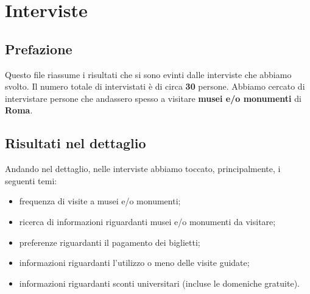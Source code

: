 \def\people{30}

\section{Interviste}
\subsection{Prefazione}
Questo file riassume i risultati che si sono evinti dalle interviste che abbiamo svolto. Il numero totale di intervistati è di circa \textbf{\people} persone. Abbiamo cercato di intervistare persone che andassero spesso a visitare \textbf{musei e/o monumenti} di \textbf{Roma}.

\subsection{Risultati nel dettaglio}
Andando nel dettaglio, nelle interviste abbiamo toccato, principalmente, i seguenti temi:
    \begin{itemize}
        \item frequenza di visite a musei e/o monumenti;
        \item ricerca di informazioni riguardanti musei e/o monumenti da visitare;
        \item preferenze riguardanti il pagamento dei biglietti;
        \item informazioni riguardanti l'utilizzo o meno delle visite guidate;
        \item informazioni riguardanti sconti universitari (incluse le domeniche gratuite).
    \end{itemize}
    
